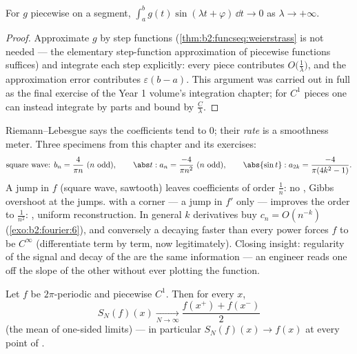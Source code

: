 \begin{theorem}\label{thm:b2:fourier:riemannlebesgue}
For $g$ piecewise  on a segment,
$\int_a^b g(t)\sin(\lambda t + \varphi)\,\dd t \to 0$ as $\lambda
\to +\infty$.
\end{theorem}

\begin{proof}
Approximate $g$  by step functions
(\cref{thm:b2:funcseq:weierstrass} is not needed --- the elementary
step-function approximation of piecewise  functions
suffices) and integrate each step explicitly: every piece
contributes $O\bigl(\frac1\lambda\bigr)$, and the approximation
error contributes $\varepsilon(b - a)$. This argument was carried
out in full as the final exercise of the Year 1 volume's
integration chapter; for $C^1$ pieces one can instead integrate by
parts and bound by $\frac C\lambda$.
\end{proof}

\begin{example}\label{ex:b2:fourier:decaytable}
Riemann--Lebesgue says the coefficients tend to $0$; their
\emph{rate} is a smoothness meter. Three specimens from this
chapter and its exercises:
\[
\text{square wave: } b_n = \frac{4}{\pi n}\ (n\ \text{odd}),
\qquad
\abs t : a_n = \frac{-4}{\pi n^2}\ (n\ \text{odd}),
\qquad
\abs{\sin t} : a_{2k} = \frac{-4}{\pi(4k^2-1)} .
\]
A jump in $f$ (square wave, sawtooth) leaves coefficients of
order $\frac1n$: no , Gibbs overshoot at the
jumps.  with a corner --- a jump in $f'$ only ---
improves the order to $\frac{1}{n^2}$: ,
uniform reconstruction. In general $k$ derivatives buy $c_n =
O(n^{-k})$ (\cref{exo:b2:fourier:6}), and conversely a 
decaying faster than every power forces $f$ to be $C^\infty$
(differentiate term by term, now legitimately). Closing
insight: regularity of the signal and decay of the 
are the same information --- an engineer reads one off the
slope of the other without ever plotting the function.
\end{example}

\begin{theorem}[Dirichlet]\label{thm:b2:fourier:dirichlet}
Let $f$ be $2\pi$-periodic and piecewise $C^1$. Then for every $x$,
\[
S_N(f)(x) \xrightarrow[N \to \infty]{}
\frac{f(x^+) + f(x^-)}{2}
\]
(the mean of one-sided limits) --- in particular $S_N(f)(x) \to
f(x)$ at every point of .
\end{theorem}


